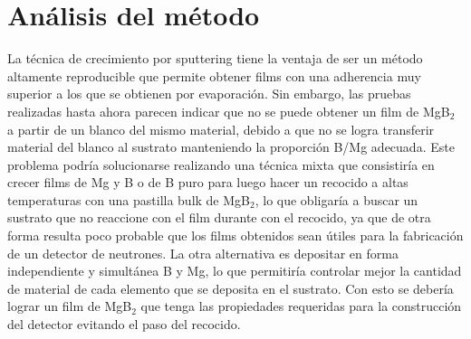 \section{Análisis del método}\label{S:sputanalisis}
La técnica de crecimiento por sputtering tiene la ventaja de ser un método altamente reproducible que permite obtener films con una adherencia muy superior a los que se obtienen por evaporación. Sin embargo, las pruebas realizadas hasta ahora parecen indicar que no se puede obtener un film de MgB$_2$ a partir de un blanco del mismo material, debido a que no se logra transferir material del blanco al sustrato manteniendo la proporción B/Mg adecuada. Este problema podría solucionarse realizando una técnica mixta que consistiría en crecer films de Mg y B o de B puro para luego hacer un recocido a altas temperaturas con una pastilla bulk de MgB$_2$, lo que obligaría a buscar un sustrato que no reaccione con el film durante con el recocido, ya que de otra forma resulta poco probable que los films obtenidos sean útiles para la fabricación de un detector de neutrones. La otra alternativa es depositar en forma independiente y simultánea B y Mg, lo que permitiría controlar mejor la cantidad de material de cada elemento que se deposita en el sustrato. Con esto se debería lograr un film de MgB$_2$ que tenga las propiedades requeridas para la construcción del detector evitando el paso del recocido.
